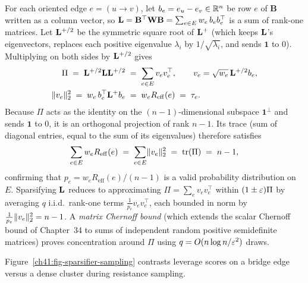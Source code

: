 \begin{whybox}
For each oriented edge $e=(u\to v)$, let $b_e = e_u - e_v \in \mathbb{R}^n$ be row $e$ of $\mathbf{B}$ written as a column vector, so $\mathbf{L}=\mathbf{B}^\top\mathbf{W}\mathbf{B}=\sum_{e \in E} w_e\,b_e b_e^\top$ is a sum of rank-one matrices. Let $\mathbf{L}^{+/2}$ be the symmetric square root of $\mathbf{L}^{+}$ (which keeps $\mathbf{L}$'s eigenvectors, replaces each positive eigenvalue $\lambda_i$ by $1/\sqrt{\lambda_i}$, and sends $\mathbf{1}$ to $0$). Multiplying on both sides by $\mathbf{L}^{+/2}$ gives
\begin{align*}
  \Pi \;=\; \mathbf{L}^{+/2}\mathbf{L}\mathbf{L}^{+/2} &\;=\; \sum_{e \in E} v_e v_e^\top,
    \qquad v_e = \sqrt{w_e}\,\mathbf{L}^{+/2}b_e, \\
  \lVert v_e\rVert_2^2 \;=\; w_e\,b_e^\top\mathbf{L}^{+}b_e &\;=\; w_e R_{\mathrm{eff}}(e) \;=\; \tau_e .
\end{align*}
Because $\Pi$ acts as the identity on the $(n-1)$-dimensional subspace $\mathbf{1}^\perp$ and sends $\mathbf{1}$ to $0$, it is an orthogonal projection of rank $n-1$. Its trace (sum of diagonal entries, equal to the sum of its eigenvalues) therefore satisfies
\[
  \sum_{e \in E} w_e R_{\mathrm{eff}}(e) \;=\; \sum_{e \in E} \lVert v_e\rVert_2^2 \;=\; \operatorname{tr}(\Pi) \;=\; n - 1 ,
\]
confirming that $p_e = w_e R_{\mathrm{eff}}(e)/(n-1)$ is a valid probability distribution on $E$. Sparsifying $\mathbf{L}$ reduces to approximating $\Pi = \sum_e v_e v_e^\top$ within $(1\pm\varepsilon)\Pi$ by averaging $q$ i.i.d.\ rank-one terms $\frac{1}{p_e} v_e v_e^\top$, each bounded in norm by $\frac{1}{p_e}\lVert v_e\rVert_2^2 = n-1$. A \emph{matrix Chernoff bound} (which extends the scalar Chernoff bound of Chapter~34 to sums of independent random positive semidefinite matrices) proves concentration around $\Pi$ using $q = O(n\log n/\varepsilon^2)$ draws.
\end{whybox}

Figure~\ref{ch41:fig-sparsifier-sampling} contrasts leverage scores on a bridge edge versus a dense cluster during resistance sampling.

